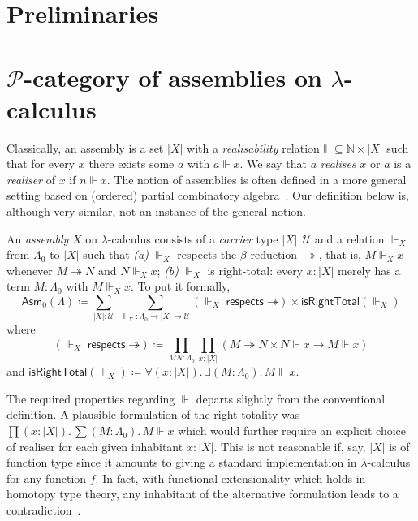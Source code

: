 \documentclass[a4paper,UKenglish,numberwithinsect,cleveref,thm-restate]{lipics-v2021}
\newcommand{\PP}{\mathscr{P}}
\newcommand{\Asm}{\mathsf{Asm}}
\newcommand{\defeq}{\coloneqq}
\newcommand{\Univ}{\mathcal{U}}
\newcommand{\reduce}{\twoheadrightarrow}
\begin{document}
\section{Preliminaries}

\section{\texorpdfstring{$\PP$}{P}-category of assemblies on \texorpdfstring{$\lambda$}{λ}-calculus}

Classically, an assembly is a set $|X|$ with a \emph{realisability} relation $\mathord{\Vdash} \subseteq \mathbb{N} \times |X|$ such that for every $x$ there exists some $a$ with $a \Vdash x$. We say that $a$ \emph{realises} $x$ or $a$ is a \emph{realiser} of $x$ if $n \Vdash x$.
The notion of assemblies is often defined in a more general setting based on (ordered) partial combinatory algebra~\cite{Oosten2008}.
Our definition below is, although very similar, not an instance of the general notion.

\begin{definition}
  An \emph{assembly} $X$ on $\lambda$-calculus consists of a \emph{carrier} type $|X| : \Univ$ and a relation ${\Vdash_X}$ from $\Lambda_0$ to $|X|$ such that
  \emph{(a)} $\Vdash_X$ respects the $\beta$-reduction $\reduce$, that is, $M \Vdash_X x$ whenever $M \reduce N$ and $N \Vdash_X x$;
  \emph{(b)} $\Vdash_X$ is right-total: every $x : |X|$ merely has a term $M : \Lambda_0$ with $M \Vdash_X x$. 
  To put it formally, 
  \[
    \Asm_0(\Lambda) \defeq \sum_{|X| : \Univ}\;\sum_{\mathord{\Vdash_X}:\Lambda_0 \to |X| \to \Univ} 
    \left(\mathord{\Vdash_X}\;\mathsf{respects}\;\mathord{\reduce}\right)
      \times \mathsf{isRightTotal}({\Vdash_X})
  \]
  where 
  \[
    \left(\mathord{\Vdash_X}\;\mathsf{respects}\;\mathord{\reduce}\right) \defeq
    \prod_{M N : \Lambda_0} \prod_{x : |X|} \left( M \reduce N \times N \Vdash x \to M \Vdash x \right)
  \]
  and $\mathsf{isRightTotal}(\Vdash_X) \defeq \forall (x : |X|).\, \exists (M : \Lambda_0).\, M \Vdash x$.
\end{definition}
The required properties regarding $\Vdash$ departs slightly from the conventional definition. 
\ltnote{Explain why $\Vdash$ respects $\reduce$}
A plausible formulation of the right totality was $\prod (x : |X|).\, \sum (M : \Lambda_0).\, M \Vdash x$ which  would further require an explicit choice of realiser for each given inhabitant $x : |X|$.
This is not reasonable if, say, $|X|$ is of function type since it amounts to giving a standard implementation in $\lambda$-calculus for any function $f$.
In fact, with functional extensionality which holds in homotopy type theory, any inhabitant of the alternative formulation leads to a contradiction~\cite{Troelstra1977}. 
\end{document}
